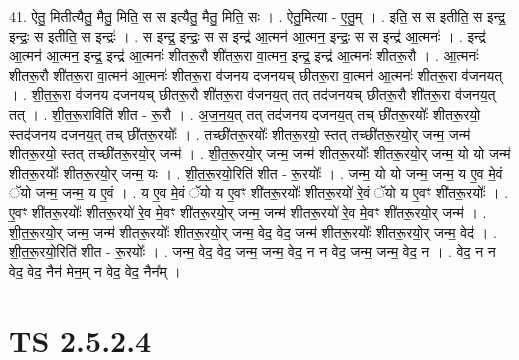 \documentclass[17pt]{extarticle}
\begin{document}
41. ऐतु॒ मितीत्यैतु॒ मैतु॒ मिति॒ स स इत्यैतु॒ मैतु॒ मिति॒ सः । . ऐतु॒मित्या - ए॒तु॒म् । . इति॒ स स इतीति॒ स इन्द्र॒ इन्द्रः॒ स इतीति॒ स इन्द्रः॑ । . स इन्द्र॒ इन्द्रः॒ स स इन्द्र॑ आ॒त्मन॑ आ॒त्मन॒ इन्द्रः॒ स स इन्द्र॑ आ॒त्मनः॑ । . इन्द्र॑ आ॒त्मन॑ आ॒त्मन॒ इन्द्र॒ इन्द्र॑ आ॒त्मनः॑ शीतरू॒रौ शी॑तरू॒रा वा॒त्मन॒ इन्द्र॒ इन्द्र॑ आ॒त्मनः॑ शीतरू॒रौ । . आ॒त्मनः॑ शीतरू॒रौ शी॑तरू॒रा वा॒त्मन॑ आ॒त्मनः॑ शीतरू॒रा व॑जनय दजनयच् छीतरू॒रा वा॒त्मन॑ आ॒त्मनः॑ शीतरू॒रा व॑जनयत् । . शी॒त॒रू॒रा व॑जनय दजनयच् छीतरू॒रौ शी॑तरू॒रा व॑जनय॒त् तत् तद॑जनयच् छीतरू॒रौ शी॑तरू॒रा व॑जनय॒त् तत् । . शी॒त॒रू॒राविति॑ शीत - रू॒रौ । . अ॒ज॒न॒य॒त् तत् तद॑जनय दजनय॒त् तच् छी॑तरू॒रयोः᳚ शीतरू॒रयो॒ स्तद॑जनय दजनय॒त् तच् छी॑तरू॒रयोः᳚ । . तच्छी॑तरू॒रयोः᳚ शीतरू॒रयो॒ स्तत् तच्छी॑तरू॒रयो॒र् जन्म॒ जन्म॑ शीतरू॒रयो॒ स्तत् तच्छी॑तरू॒रयो॒र् जन्म॑ । . शी॒त॒रू॒रयो॒र् जन्म॒ जन्म॑ शीतरू॒रयोः᳚ शीतरू॒रयो॒र् जन्म॒ यो यो जन्म॑ शीतरू॒रयोः᳚ शीतरू॒रयो॒र् जन्म॒ यः । . शी॒त॒रू॒रयो॒रिति॑ शीत - रू॒रयोः᳚ । . जन्म॒ यो यो जन्म॒ जन्म॒ य ए॒व मे॒वं ॅयो जन्म॒ जन्म॒ य ए॒वं । . य ए॒व मे॒वं ॅयो य ए॒वꣳ शी॑तरू॒रयोः᳚ शीतरू॒रयो॑ रे॒वं ॅयो य ए॒वꣳ शी॑तरू॒रयोः᳚ । . ए॒वꣳ शी॑तरू॒रयोः᳚ शीतरू॒रयो॑ रे॒व मे॒वꣳ शी॑तरू॒रयो॒र् जन्म॒ जन्म॑ शीतरू॒रयो॑ रे॒व मे॒वꣳ शी॑तरू॒रयो॒र् जन्म॑ । . शी॒त॒रू॒रयो॒र् जन्म॒ जन्म॑ शीतरू॒रयोः᳚ शीतरू॒रयो॒र् जन्म॒ वेद॒ वेद॒ जन्म॑ शीतरू॒रयोः᳚ शीतरू॒रयो॒र् जन्म॒ वेद॑ । . शी॒त॒रू॒रयो॒रिति॑ शीत - रू॒रयोः᳚ । . जन्म॒ वेद॒ वेद॒ जन्म॒ जन्म॒ वेद॒ न न वेद॒ जन्म॒ जन्म॒ वेद॒ न । . वेद॒ न न वेद॒ वेद॒ नैन॑ मेन॒म् न वेद॒ वेद॒ नैन᳚म् । \newline
\pagebreak
{}

\section{ TS 2.5.2.4 }
\end{document}
